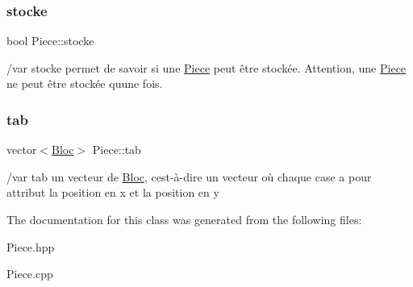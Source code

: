 \subsubsection{\texorpdfstring{stocke}{stocke}}
{\footnotesize\ttfamily bool Piece\+::stocke\hspace{0.3cm}{\ttfamily [protected]}}

/var stocke permet de savoir si une \hyperlink{classPiece}{Piece} peut être stockée. Attention, une \hyperlink{classPiece}{Piece} ne peut être stockée qu\textquotesingle{}une fois. \mbox{\label{classPiece_a9ea65e906b9ef0c30594f4f5aa5ed444}} 
\subsubsection{\texorpdfstring{tab}{tab}}
{\footnotesize\ttfamily vector$<$\hyperlink{classBloc}{Bloc}$>$ Piece\+::tab\hspace{0.3cm}{\ttfamily [protected]}}

/var tab un vecteur de \hyperlink{classBloc}{Bloc}, c\textquotesingle{}est-\/à-\/dire un vecteur où chaque case a pour attribut la position en x et la position en y 

The documentation for this class was generated from the following files\+:\begin{DoxyCompactItemize}
\item 
Piece.\+hpp\item 
Piece.\+cpp\end{DoxyCompactItemize}
